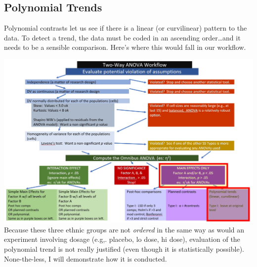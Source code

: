 \documentclass[
  11pt,
]{book}
\newenvironment{Shaded}{\begin{snugshade}}{\end{snugshade}}
\newcommand{\AttributeTok}[1]{\textcolor[rgb]{0.77,0.63,0.00}{#1}}
\newcommand{\DecValTok}[1]{\textcolor[rgb]{0.00,0.00,0.81}{#1}}
\newcommand{\FunctionTok}[1]{\textcolor[rgb]{0.00,0.00,0.00}{#1}}
\newcommand{\NormalTok}[1]{#1}
\newcommand{\OtherTok}[1]{\textcolor[rgb]{0.56,0.35,0.01}{#1}}
\newcommand{\SpecialCharTok}[1]{\textcolor[rgb]{0.00,0.00,0.00}{#1}}
\begin{document}
\hypertarget{polynomial-trends}{%
\subsection{Polynomial Trends}\label{polynomial-trends}}

Polynomial contrasts let us see if there is a linear (or curvilinear) pattern to the data. To detect a trend, the data must be coded in an ascending order\ldots and it needs to be a sensible comparison. Here's where this would fall in our workflow.

\includegraphics{images/factorial/wfMain_Poly.jpg}
Because these three ethnic groups are not \emph{ordered} in the same way as would an experiment involving dosage (e.g,. placebo, lo dose, hi dose), evaluation of the polynomial trend is not really justified (even though it is statistically possible). None-the-less, I will demonstrate how it is conducted.

\begin{Shaded}
\end{Shaded}
\end{document}

